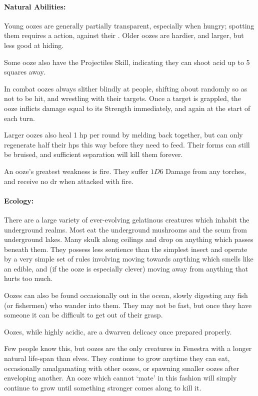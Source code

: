\begin{multicols}{2}
\paragraph{Natural Abilities:} Young oozes are generally partially transparent, especially when hungry; spotting them requires a  action, against their .
Older oozes are hardier, and larger, but less good at hiding.

Some ooze also have the Projectiles Skill, indicating they can shoot acid up to 5 squares away.

In combat oozes always slither blindly at people, shifting about randomly so as not to be hit, and wrestling with their targets.
Once a target is grappled, the ooze inflicts damage equal to its Strength immediately, and again at the start of each turn.

Larger oozes also heal 1 \gls{hp} per round by melding back together, but can only regenerate half their \glspl{hp} this way before they need to feed.
Their forms can still be bruised, and sufficient separation will kill them forever.

An ooze's greatest weakness is fire.
They suffer $1D6$ Damage from any torches, and receive no \gls{dr} when attacked with fire.

\paragraph{Ecology:} There are a large variety of ever-evolving gelatinous creatures which inhabit the underground realms.
Most eat the underground mushrooms and the scum from underground lakes.
Many skulk along ceilings and drop on anything which passes beneath them.
They possess less sentience than the simplest insect and operate by a very simple set of rules involving moving towards anything which smells like an edible, and (if the ooze is especially clever) moving away from anything that hurts too much.

Oozes can also be found occasionally out in the ocean, slowly digesting any fish (or fishermen) who wander into them.
They may not be fast, but once they have someone it can be difficult to get out of their grasp.

Oozes, while highly acidic, are a dwarven delicacy once prepared properly.

Few people know this, but oozes are the only creatures in Fenestra with a longer natural life-span than elves.
They continue to grow anytime they can eat, occasionally amalgamating with other oozes, or spawning smaller oozes after enveloping another.
An ooze which cannot `mate' in this fashion will simply continue to grow until something stronger comes along to kill it.


\end{multicols}
